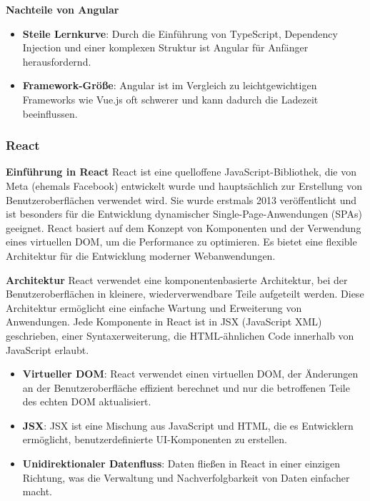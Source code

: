 \textbf{Nachteile von Angular}
\begin{itemize}
	\item \textbf{Steile Lernkurve}: Durch die Einführung von TypeScript, Dependency Injection und einer komplexen Struktur ist Angular für Anfänger herausfordernd.\textit{\cite{madurapperuma2022state, rathinam2022analysis, angular_blog}}
	\item \textbf{Framework-Größe}: Angular ist im Vergleich zu leichtgewichtigen Frameworks wie Vue.js oft schwerer und kann dadurch die Ladezeit beeinflussen.\textit{\cite{shetty2020review, angular}}
\end{itemize}


\subsubsection{React}

\textbf{Einführung in React}
\newline
React ist eine quelloffene JavaScript-Bibliothek, die von Meta (ehemals Facebook) entwickelt wurde und hauptsächlich zur Erstellung von Benutzeroberflächen verwendet wird. Sie wurde erstmals 2013 veröffentlicht und ist besonders für die Entwicklung dynamischer Single-Page-Anwendungen (SPAs) geeignet. React basiert auf dem Konzept von Komponenten und der Verwendung eines virtuellen DOM, um die Performance zu optimieren. Es bietet eine flexible Architektur für die Entwicklung moderner Webanwendungen.\textit{\cite{rathinam2022analysis, hutagikar2020analysis, react}} \newline

\textbf{Architektur}
\newline
React verwendet eine komponentenbasierte Architektur, bei der Benutzeroberflächen in kleinere, wiederverwendbare Teile aufgeteilt werden. Diese Architektur ermöglicht eine einfache Wartung und Erweiterung von Anwendungen. Jede Komponente in React ist in JSX (JavaScript XML) geschrieben, einer Syntaxerweiterung, die HTML-ähnlichen Code innerhalb von JavaScript erlaubt.

\begin{itemize}
	\item \textbf{Virtueller DOM}: React verwendet einen virtuellen DOM, der Änderungen an der Benutzeroberfläche effizient berechnet und nur die betroffenen Teile des echten DOM aktualisiert.
	\item \textbf{JSX}: JSX ist eine Mischung aus JavaScript und HTML, die es Entwicklern ermöglicht, benutzerdefinierte UI-Komponenten zu erstellen.
	\item \textbf{Unidirektionaler Datenfluss}: Daten fließen in React in einer einzigen Richtung, was die Verwaltung und Nachverfolgbarkeit von Daten einfacher macht.\textit{\cite{rathinam2022analysis, hutagikar2020analysis, react}}
\end{itemize}

